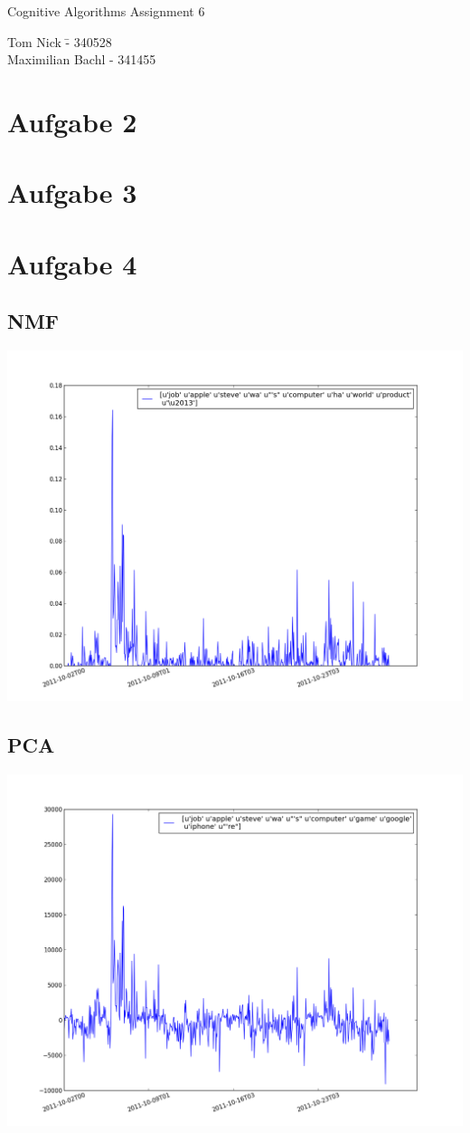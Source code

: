 \documentclass[a4paper,10pt]{article}
\begin{document}
\begin{center}
\Large{Cognitive Algorithms Assignment 6} \\
\end{center}
\begin{tabbing}
Tom Nick \hspace{2cm}\= - 340528\\
Maximilian Bachl \> - 341455 \\
\end{tabbing}

\section*{Aufgabe 2}
\section*{Aufgabe 3}
\section*{Aufgabe 4}

\subsection*{NMF}
\includegraphics[width=20cm]{nmf_exercise_4.png}

\subsection*{PCA}
\includegraphics[width=20cm]{pca_exercise_4.png}

		
\end{document}
